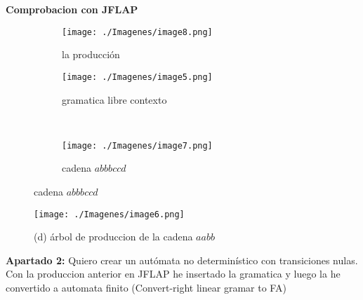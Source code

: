 \documentclass{article}
\begin{document}
        \vspace{\baselineskip} %
        \textbf{Comprobacion con JFLAP}
            \begin{figure}[!h] 
            \centering
                \centering
                \begin{subfigure}[b]{0.35\textwidth}
                    \centering
                    \texttt{[image: ./Imagenes/image8.png]}
                    \caption{la producción}
                    \label{fig:label1}
                \end{subfigure}
                \hfill
                \begin{subfigure}[b]{0.55\textwidth}
                    \centering
                    \texttt{[image: ./Imagenes/image5.png]}
                    \caption{gramatica libre contexto}
                    \label{fig:label2}
                \end{subfigure}
                \vspace{0.5cm} 
                \\
                \begin{subfigure}[b]{0.25\textwidth}
                    \centering
                    \texttt{[image: ./Imagenes/image7.png]}
                    \caption{cadena $abbbccd$}
                    \label{fig:label3}
                \end{subfigure}
                \label{fig:matrix1}
            \end{figure}


        \newpage


        \begin{figure}[!h]
            \centering
            \texttt{[image: ./Imagenes/image6.png]}
            \caption*{ (d) árbol de produccion de la cadena  $aabb$}
            \label{fig:label4}
        \end{figure}
        \vspace{\baselineskip} %


        \textbf{Apartado 2:}
        Quiero crear un autómata no determinístico con transiciones nulas.
        Con la produccion anterior en JFLAP he insertado la gramatica y luego la he convertido a automata finito (Convert-right linear gramar to FA)
        \vspace{\baselineskip} %
\end{document}
